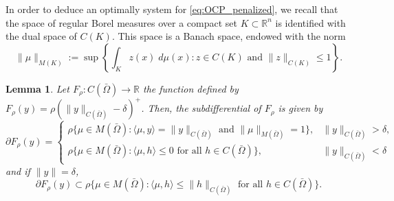 \documentclass[11pt,a4paper]{amsart}
\renewcommand{\l}{\left}
\renewcommand{\r}{\right}
\newcommand{\om}{\Omega}
\newtheorem{lemma}{{Lemma}}
\newcommand{\norm}[1]{\lVert #1 \rVert}
\begin{document}
In order to deduce an optimally system for \eqref{eq:OCP_penalized}, we recall that the space of regular Borel measures over a compact set $K\subset \mathbb{R}^n$ is identified with the dual space of $C(K)$. This space is a Banach space, endowed with the norm
\[
\norm{\mu}_{M(K)}:=\sup \l\{\int_{K}z(x)\;d\mu(x): z\in C(K) \mbox{ and }\norm{z}_{C(K)}\le 1 \r\}.
\]

\begin{lemma}
    Let $F_{\rho}:C(\bar\om)\to \mathbb{R}$ the function defined by $F_{\rho}(y)=\rho\l(\norm{y}_{C(\bar\om)}-\delta\r)^+$. Then, the subdifferential of $F_{\rho}$ is given by
    \begin{equation}\label{eq:subdiff_f_rho_nedelta}
        \partial F_{\rho}(y)=\begin{cases}
            \rho\{\mu \in M(\bar \om): \langle \mu, y\rangle=\norm{y}_{C(\bar \om)} \mbox{ and }\norm{\mu}_{M(\bar\om)}=1\}, & \norm{y}_{C(\bar\om)}>\delta,\\            
            \rho\{\mu \in M(\bar\om): \langle \mu,h\rangle\le 0 \mbox{ for all }h\in C(\bar\om)\},&\norm{y}_{C(\bar\om)}<\delta
        \end{cases}
    \end{equation}
    and if $\norm{y}=\delta$,
    \begin{equation}\label{eq:subdiff_f_rho_eqdelta}
        \partial F_{\rho}(y)\subset \rho\{\mu \in M(\bar\om): \langle\mu,h\rangle \le \norm{h}_{C(\bar\om)} \mbox{ for all }h\in C(\bar\om)\}.
    \end{equation}
\end{lemma}
\end{document}
